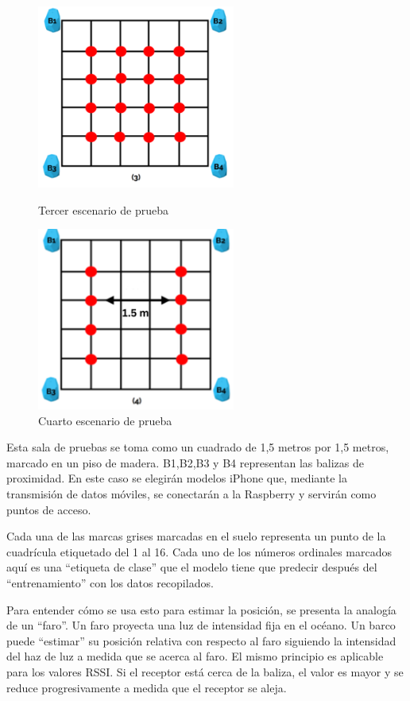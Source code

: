 \begin{figure}[H]
    \begin{minipage}[b]{0.45\textwidth}
        \centering
    \includegraphics[width=6.5cm]{figs/cuatro_apes}
        \caption{Tercer escenario de prueba}
        \label{fig:escenario3}
    \end{minipage}
    \hfill
    \begin{minipage}[b]{0.45\textwidth}
        \centering
    \includegraphics[width=6.5cm]{figs/cuatro_apes_espaciados}
        \caption{Cuarto escenario de prueba}
        \label{fig:escenario4}
    \end{minipage}
\end{figure}


Esta sala de pruebas se toma como un cuadrado de 1,5 metros por 1,5 metros, marcado en un piso de madera. B1,B2,B3 y B4 representan las balizas de proximidad. En este caso se elegirán modelos iPhone que, mediante la transmisión de datos móviles, se conectarán a la Raspberry y servirán como puntos de acceso.

Cada una de las marcas grises marcadas en el suelo representa un punto de la cuadrícula etiquetado del 1 al 16. Cada uno de los números ordinales marcados aquí es una “etiqueta de clase” que el modelo tiene que predecir después del “entrenamiento” con los datos recopilados.

Para entender cómo se usa esto para estimar la posición, se presenta la analogía de un “faro”. Un faro proyecta una luz de intensidad fija en el océano. Un barco puede “estimar” su posición relativa con respecto al faro siguiendo la intensidad del haz de luz a medida que se acerca al faro. El mismo principio es aplicable para los valores RSSI. Si el receptor está cerca de la baliza, el valor es mayor y se reduce progresivamente a medida que el receptor se aleja.

